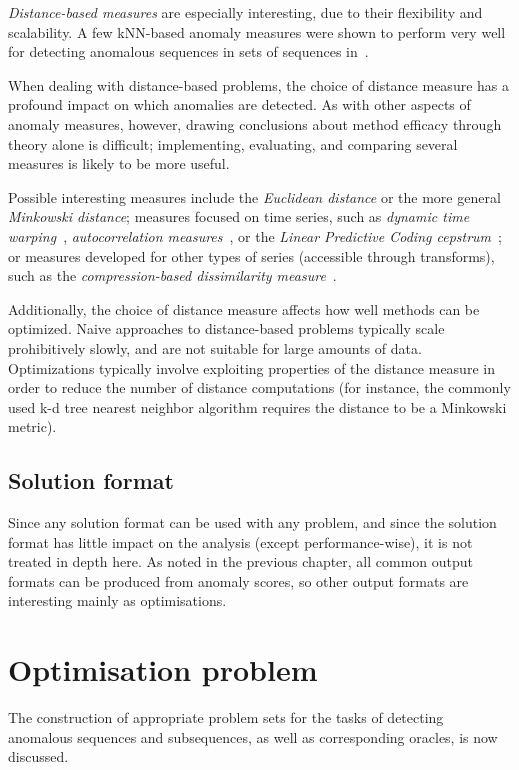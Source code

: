 \emph{Distance-based measures} are especially interesting, due to their flexibility and scalability. A few kNN-based anomaly measures were shown to perform very well for detecting anomalous sequences in sets of sequences in~\cite{chandola3}.

When dealing with distance-based problems, the choice of distance measure has a profound impact on which anomalies are detected. As with other aspects of anomaly measures, however, drawing conclusions about method efficacy through theory alone is difficult; implementing, evaluating, and comparing several measures is likely to be more useful.

Possible interesting measures include the \emph{Euclidean distance} or the more general \emph{Minkowski distance}; measures focused on time series, such as \emph{dynamic time warping}~\cite{dtw}, \emph{autocorrelation measures}~\cite{autocorrelation}, or the \emph{Linear Predictive Coding cepstrum}~\cite{cepstrum}; or measures developed for other types of series (accessible through transforms), such as the \emph{compression-based dissimilarity measure}~\cite{keogh2}.

Additionally, the choice of distance measure affects how well methods can be optimized. Naive approaches to distance-based problems typically scale prohibitively slowly, and are not suitable for large amounts of data. Optimizations typically involve exploiting properties of the distance measure in order to reduce the number of distance computations (for instance, the commonly used k-d tree nearest neighbor algorithm requires the distance to be a Minkowski metric).

\subsection{Solution format}

Since any solution format can be used with any problem, and since the solution format has little impact on the analysis (except performance-wise), it is not treated in depth here. As noted in the previous chapter, all common output formats can be produced from anomaly scores, so other output formats are interesting mainly as optimisations.

\section{Optimisation problem}

The construction of appropriate problem sets for the tasks of detecting anomalous sequences and subsequences, as well as corresponding oracles, is now discussed.

